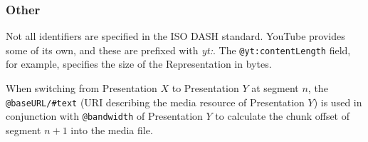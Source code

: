\subsubsection{Other}
Not all identifiers are specified in the ISO DASH standard. YouTube
provides some of its own, and these are prefixed with \textit{yt:}.
The \texttt{@yt:contentLength} field, for example, specifies the size of the
Representation in bytes.

When switching from Presentation $X$ to Presentation $Y$ at segment $n$, the
\texttt{@baseURL/\#text} (URI describing the media resource of Presentation $Y$)
is used in conjunction with \texttt{@bandwidth} of Presentation $Y$ to
calculate the chunk offset of segment $n+1$ into the media file.

